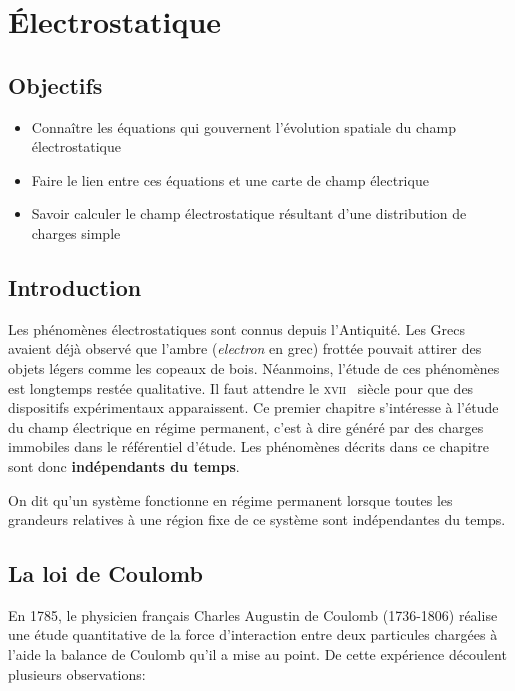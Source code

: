 \chapter{Électrostatique}
\label{chap:electrostatique}
\section*{Objectifs}%
\label{sec:objectifs}
\begin{itemize}
	\item Connaître les équations qui gouvernent l'évolution spatiale 
	  du champ électrostatique
	\item Faire le lien entre ces équations et une carte de champ 
	  électrique
	\item Savoir calculer le champ électrostatique résultant d'une 
	  distribution de charges simple
\end{itemize}
\section*{Introduction}%
\label{sec:introduction}
Les phénomènes électrostatiques sont connus depuis l'Antiquité.
Les Grecs avaient déjà observé que l'ambre (\emph{electron} en grec)
frottée pouvait attirer des objets
légers comme les copeaux de bois.
Néanmoins, l'étude de ces phénomènes est longtemps restée qualitative.
Il faut attendre le \textsc{xvii} \ieme~siècle pour que des dispositifs 
expérimentaux apparaissent.
Ce premier chapitre s'intéresse à l'étude du champ électrique 
en régime permanent, c'est à dire généré par des charges immobiles dans le 
référentiel d'étude. Les phénomènes décrits dans ce chapitre sont 
donc \textbf{indépendants du temps}.

\begin{defn}
	On dit qu'un système fonctionne en régime permanent lorsque toutes les
	grandeurs relatives à une région fixe de ce système sont indépendantes 
	du temps.
\end{defn}

\section{La loi de Coulomb}%
\label{sec:interaction_coulombienne}
En 1785,  le physicien français Charles Augustin de Coulomb (1736-1806)
réalise une étude quantitative de la force d'interaction entre deux particules
chargées à l'aide la balance de Coulomb qu'il a mise au point.
De cette expérience découlent plusieurs observations:

